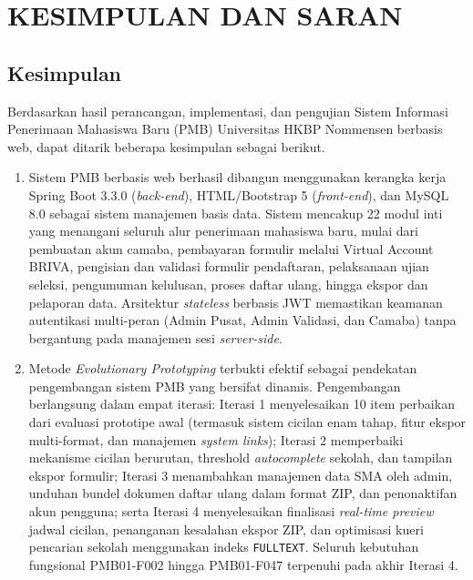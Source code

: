 \newpage
\chapter{KESIMPULAN DAN SARAN} \label{Bab V}

\section{Kesimpulan} \label{V.Kesimpulan}

Berdasarkan hasil perancangan, implementasi, dan pengujian Sistem Informasi Penerimaan Mahasiswa Baru (PMB) Universitas HKBP Nommensen berbasis web, dapat ditarik beberapa kesimpulan sebagai berikut.\par

\begin{enumerate}
	\item Sistem PMB berbasis web berhasil dibangun menggunakan kerangka kerja Spring Boot 3.3.0 (\textit{back-end}), HTML/Bootstrap 5 (\textit{front-end}), dan MySQL 8.0 sebagai sistem manajemen basis data. Sistem mencakup 22 modul inti yang menangani seluruh alur penerimaan mahasiswa baru, mulai dari pembuatan akun camaba, pembayaran formulir melalui Virtual Account BRIVA, pengisian dan validasi formulir pendaftaran, pelaksanaan ujian seleksi, pengumuman kelulusan, proses daftar ulang, hingga ekspor dan pelaporan data. Arsitektur \textit{stateless} berbasis JWT memastikan keamanan autentikasi multi-peran (Admin Pusat, Admin Validasi, dan Camaba) tanpa bergantung pada manajemen sesi \textit{server-side}.
	
	\item Metode \textit{Evolutionary Prototyping} terbukti efektif sebagai pendekatan pengembangan sistem PMB yang bersifat dinamis. Pengembangan berlangsung dalam empat iterasi: Iterasi 1 menyelesaikan 10 item perbaikan dari evaluasi prototipe awal (termasuk sistem cicilan enam tahap, fitur ekspor multi-format, dan manajemen \textit{system links}); Iterasi 2 memperbaiki mekanisme cicilan berurutan, threshold \textit{autocomplete} sekolah, dan tampilan ekspor formulir; Iterasi 3 menambahkan manajemen data SMA oleh admin, unduhan bundel dokumen daftar ulang dalam format ZIP, dan penonaktifan akun pengguna; serta Iterasi 4 menyelesaikan finalisasi \textit{real-time preview} jadwal cicilan, penanganan kesalahan ekspor ZIP, dan optimisasi kueri pencarian sekolah menggunakan indeks \texttt{FULLTEXT}. Seluruh kebutuhan fungsional PMB01-F002 hingga PMB01-F047 terpenuhi pada akhir Iterasi 4.
	

\end{enumerate}
